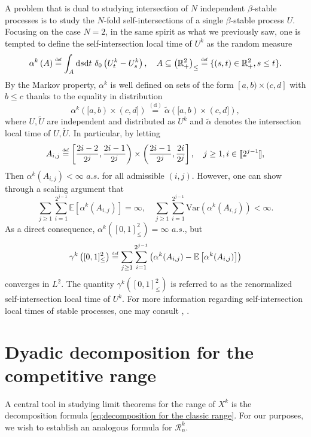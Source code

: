 \documentclass[10pt,a4paper]{amsart}
\newcommand{\RR}{\mathbb R}
\newcommand{\EE}{\mathbb E}
\newcommand{\1}{\mathds{1}}
\renewcommand{\d}{\mathrm d}
\newcommand{\eqdef}{\stackrel{\scaleto{\mathrm{def}}{3.5pt}}{=}}
\numberwithin{equation}{section}
\begin{document}
A problem that is dual to studying intersection of $N$ independent $\beta$-stable processes is to study the $N$-fold self-intersections of a single $\beta$-stable process $U$. Focusing on the case $N=2$, in the same spirit as what we previously saw, one is tempted to define the self-intersection local time of $U^k$ as the random measure
\begin{equation*}
    \alpha^k\left(A\right)\eqdef\int_A\d s \d t\ \delta_0\left(U_t^k-U_s^k\right),\quad A\subseteq\left(\RR_+^2\right)_\le\eqdef\{(s,t)\in\RR_+^2, s\le t\}.
\end{equation*}
By the Markov property, $\alpha^k$ is well defined on sets of the form $[a,b)\times(c,d]$ with $b\le c$ thanks to the equality in distribution
\begin{equation*}
    \alpha^k([a,b)\times(c,d])\overset{\mathrm{(d)}}=\widetilde \alpha([a,b)\times(c,d]),
\end{equation*}
where $U,\widetilde U$ are independent and distributed as $U^k$ and $\widetilde\alpha$ denotes the intersection local time of $U,\widetilde U$. In particular, by letting 
\begin{equation*}
    A_{i,j}\eqdef\left[\frac{2i-2}{2^j},\frac{2i-1}{2^j}\right)\times\left(\frac{2i-1}{2^j},\frac{2i}{2^j}\right],\quad j\ge1,i\in[\![2^{j-1}]\!],
\end{equation*}
Then $\alpha^k(A_{i,j})<\infty$ $a.s.$ for all admissible $(i,j)$. However, one can show through a scaling argument that
\begin{equation*}
    \sum_{j\ge1}\sum_{i=1}^{2^{j-1}}\EE\left[\alpha^k(A_{i,j})\right]=\infty,\quad  \sum_{j\ge1}\sum_{i=1}^{2^{j-1}}\mathrm{Var}\left(\alpha^k\left(A_{i,j}\right)\right)<\infty.
\end{equation*}
As a direct consequence, $\alpha^k\left([0,1]_\le^2\right)=\infty$ $a.s.$, but
\begin{equation*}
    \gamma^k\left([0,1]_\le^2\right)\eqdef\sum_{j\ge1}\sum_{i=1}^{2^{j-1}}\left(\alpha^k(A_{i,j})-\EE\left[\alpha^k(A_{i,j})\right]\right)
\end{equation*}
converges in $L^2$. The quantity $\gamma^k\left([0,1]_\le^2\right)$ is referred to as the renormalized self-intersection local time of $U^k$. For more information regarding self-intersection local times of stable processes, one may consult \cite{BassChenRosenLDSILT}, \cite{ChenRosen2005}.

\section{Dyadic decomposition for the competitive range}
A central tool in studying limit theorems for the range of $X^k$ is the decomposition formula \eqref{eq:decomposition for the classic range}. For our purposes, we wish to establish an analogous formula for $\mathcal R_n^k$.
\end{document}

